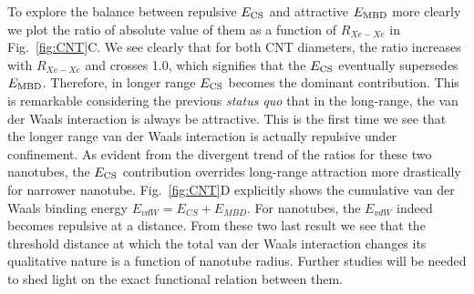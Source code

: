 \documentclass[aps,prl,groupaddress, twocolumn]{revtex4-1}  %
\begin{document}
To explore the balance between repulsive $E_{\rm CS}$ and attractive $E_{\rm MBD}$ more clearly we plot the ratio of absolute value of them as a function of $R_{Xe-Xe}$ in Fig.~\ref{fig:CNT}C. We see clearly that for both CNT diameters, the ratio increases with $R_{Xe-Xe}$ and crosses 1.0, which signifies that the $E_{\rm CS}$ eventually supersedes $E_{\rm MBD}$. Therefore, in longer range $E_{\rm CS}$ becomes the dominant contribution. This is remarkable considering the previous \textit{status quo} that in the long-range, the van der Waals interaction is always be attractive. This is the first time we see that the longer range van der Waals interaction is actually repulsive under confinement. As evident from the divergent trend of the ratios for these two nanotubes, the $E_{\rm CS}$ contribution overrides long-range attraction more drastically for narrower nanotube. Fig.~\ref{fig:CNT}D explicitly shows the cumulative van der Waals binding energy $E_{vdW} = E_{CS} + E_{MBD}$. For nanotubes, the $E_{vdW}$ indeed becomes repulsive at a distance. From these two last result we see that the threshold distance at which the total van der Waals interaction changes its qualitative nature is a function of nanotube radius. Further studies will be needed to shed light on the exact functional relation between them. 
\end{document}
